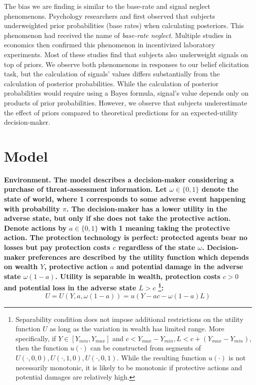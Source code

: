 \documentclass[12pt,a4paper]{article}
\begin{document}
The bias we are finding is similar to the base-rate and signal neglect phenomenons. Psychology researchers \citet{hammerton_case_1973} and \citet{kahneman_psychology_1973} first observed that subjects underweighted prior probabilities (base rates) when calculating posteriors. This phenomenon had received the name of \textit{base-rate neglect}. Multiple studies in economics then confirmed \citep*{grether_testing_1992, holt_update_2009} this phenomenon in incentivized laboratory experiments. Most of these studies find that subjects also underweight signals on top of priors.  We observe both phenomenons in responses to our belief elicitation task, but the calculation of signals' values differs substantially from the calculation of posterior probabilities. While the calculation of posterior probabilities would require using a Bayes formula, signal's value depends only on products of prior probabilities. However, we observe that subjects underestimate the effect of priors compared to theoretical predictions for an expected-utility decision-maker.


\vspace{20pt}

\section{Model}
\vspace{10pt}
\bf Environment. \rm The model describes a decision-maker considering a purchase of threat-assessment information. Let $\omega \in \{0,1\}$ denote the state of world, where 1 corresponds to some adverse event happening with probability $\pi$. The decision-maker has a lower utility in the adverse state, but only if she does not take the protective action. Denote actions by $a\in\{0,1\}$ with 1 meaning taking the protective action. The protection technology is perfect: protected agents bear no losses but pay protection costs $c$ regardless of the state $\omega$. Decision-maker preferences are described by the utility function which depends on wealth $Y$, protective action $a$ and potential damage in the adverse state $\omega(1-a)$. Utility is separable in wealth, protection costs $c>0$ and potential loss in the adverse state $L>c$ \footnote{Separability condition does not impose additional restrictions on the utility function $U$ as long as the variation in wealth has limited range. More specifically, if $Y \in [Y_{min},Y_{max}]$ and $c<Y_{max}-Y_{min}, L<c+(Y_{max}-Y_{min})$, then the function $u(\cdot)$ can be constructed from segments of $U(\cdot,0,0), U(\cdot,1,0), U(\cdot,0,1)$.  While the resulting function $u(\cdot)$ is not necessarily monotonic, it is likely to be monotonic if protective actions and potential damages are relatively high.}:
\begin{equation}
U=U(Y,a,\omega(1-a))=u(Y-ac-\omega(1-a)L)
\end{equation}
\end{document}
